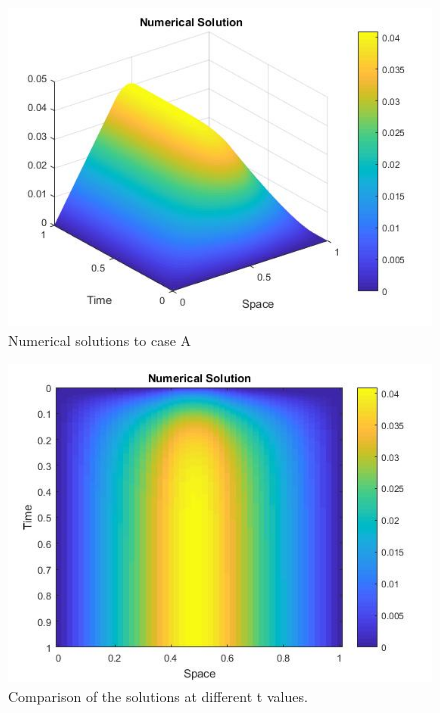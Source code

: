 \documentclass{article}
\begin{document}
\begin{figure}[bp!]
	\begin{center}
		\includegraphics[width=\textwidth,height=\textheight,keepaspectratio]{MATLAB/D1.jpg}
	\end{center}
	\caption{Numerical solutions to case A}
\end{figure}
\begin{figure}
	\begin{center}
		\includegraphics[width=\textwidth,height=\textheight,keepaspectratio]{MATLAB/D2.jpg}
	\end{center}
	\caption{Comparison of the solutions at different t values.}
\end{figure}
\end{document}
